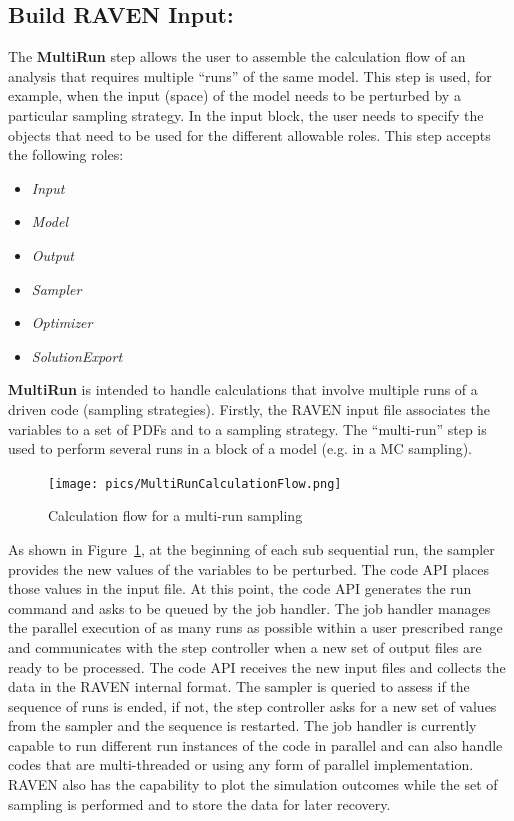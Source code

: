 \subsection{Build RAVEN Input: }
The \textbf{MultiRun} step allows the user to assemble the calculation flow of an analysis that requires multiple
``runs'' of the same model. This step is used, for example, when the input (space) of the model needs to be
perturbed by a particular sampling strategy. In the  input block, the user needs to specify the
objects that need to be used for the different allowable roles. This step accepts the following roles:

\begin{itemize}
  \item \textit{Input}
  \item \textit{Model}
  \item \textit{Output}
  \item \textit{Sampler}
  \item \textit{Optimizer}
  \item \textit{SolutionExport}
\end{itemize}

\textbf{MultiRun} is intended to handle calculations that involve multiple runs of a driven code (sampling strategies).
Firstly, the RAVEN input file associates the variables to a set of PDFs and to a sampling strategy. The ``multi-run''
step is used to perform several runs in a block of a model (e.g. in a MC sampling).

\begin{figure}[ht]
  \centering
  \texttt{[image: pics/MultiRunCalculationFlow.png]}
  \caption{Calculation flow for a multi-run sampling}
  \label{fig:multiRun}
\end{figure}

As shown in Figure~\ref{fig:multiRun}, at the beginning of each sub sequential run, the sampler provides the new values of the variables to be perturbed.
The code API places those values in the input file. At this point, the code API generates the run command and asks
to be queued by the job handler. The job handler manages the parallel execution of as many runs as possible within
a user prescribed range and communicates with the step controller when a new set of output files are ready to be
processed. The code API receives the new input files and collects the data in the RAVEN internal format. The sampler
is queried to assess if the sequence of runs is ended, if not, the step controller asks for a new set of values
from the sampler and the sequence is restarted.
The job handler is currently capable to run different run instances of the code in parallel and can also handle
codes that are multi-threaded or using any form of parallel implementation.
RAVEN also has the capability to plot the simulation outcomes while the set of sampling is performed and to store
the data for later recovery.

